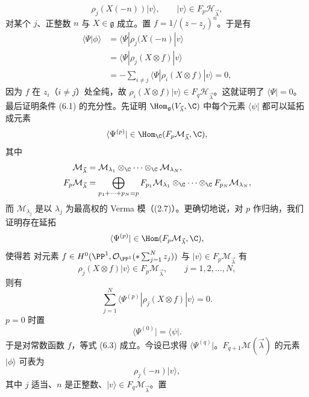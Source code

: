 \[
\rho_j(X(-n))|v\rangle,\qquad |v\rangle\in F_p\mathcal{H}_{\vec\lambda},
\]
对某个 $j$、正整数 $n$ 与 $X\in\mathfrak{g}$ 成立。置 $f=1/(z-z_j)^n$。于是有
\begin{align*}
\langle\Psi|\phi\rangle&=\langle\Psi|\rho_j(X(-n)|v\rangle\\
&=\langle\Psi|\rho_j(X\otimes f)|v\rangle\\
&=-\sum_{i\ne j}\langle\Psi|\rho_i(X\otimes f)|v\rangle=0,
\end{align*}
因为 $f$ 在 $z_i$（$i\ne j$）处全纯，故 $\rho_i(X\otimes f)|v\rangle\in F_q\mathcal{H}_{\vec\lambda}$。这就证明了 $\langle\Psi|=0$。
最后证明条件 (6.1) 的充分性。先证明 $\Hom_{\mathfrak{g}}(V_{\vec\lambda},\C)$ 中每个元素 $\langle\psi|$ 都可以延拓成元素
\[
\langle\Psi^{(p)}|\in\Hom_{\C}(F_p\mathcal{M}_{\vec\lambda},\C),
\]
其中
\begin{align*}
\mathcal{M}_{\vec\lambda}&=\mathcal{M}_{\lambda_1}\otimes_{\C}\cdots\otimes_{\C}\mathcal{M}_{\lambda_N},\\
F_p\mathcal{M}_{\vec\lambda}&=\bigoplus_{p_1+\cdots+p_N=p}F_{p_1}\mathcal{M}_{\lambda_1}\otimes_{\C}\cdots\otimes_{\C}F_{p_N}\mathcal{M}_{\lambda_N},
\end{align*}
而 $\mathcal{M}_{\lambda_j}$ 是以 $\lambda_j$ 为最高权的 Verma 模（(2.7)）。更确切地说，对 $p$ 作归纳，我们证明存在延拓
\[
\langle\Psi^{(p)}|\in\Hom(F_p\mathcal{M}_{\vec\lambda},\C),
\]
使得若
对元素 $f\in H^0(\PP^1,\mathcal{O}_{\PP^1}(*\sum_{j=1}^{N}z_j))$ 与 $|v\rangle\in F_p\mathcal{M}_{\vec\lambda}$ 有
\[
\rho_j(X\otimes f)|v\rangle\in F_p\mathcal{M}_{\vec\lambda},\qquad j=1,2,\dots,N,
\]
则有
\begin{equation}
\sum_{j=1}^{N}\langle\Psi^{(p)}|\rho_j(X\otimes f)|v\rangle=0.\tag{6.3}
\end{equation}
$p=0$ 时置
\[
\langle\Psi^{(0)}|=\langle\psi|.
\]
于是对常数函数 $f$，等式 (6.3) 成立。今设已求得 $\langle\Psi^{(q)}|$。$F_{q+1}\mathcal{M}(\vec\lambda)$ 的元素 $|\phi\rangle$ 可表为
\[
\rho_j(-n)|v\rangle,
\]
其中 $j$ 适当、$n$ 是正整数、$|v\rangle\in F_q\mathcal{M}_{\vec\lambda}$。置

